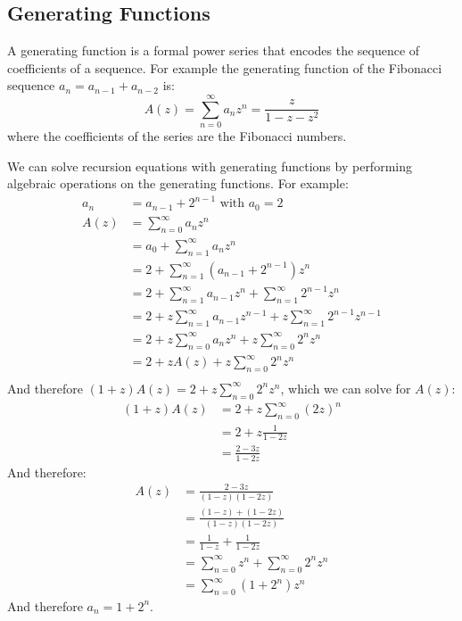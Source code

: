 \subsection{Generating Functions}
A generating function is a formal power series that encodes the sequence of coefficients of a sequence. For example the generating function of the Fibonacci sequence \( a_n = a_{n-1} + a_{n-2} \) is:
\begin{equation*}
    A(z) = \sum_{n=0}^{\infty} a_n z^n = \frac{z}{1 - z - z^2}
\end{equation*}
where the coefficients of the series are the Fibonacci numbers.

We can solve recursion equations with generating functions by performing algebraic operations on the generating functions. For example:
\begin{align*}
    a_n &= a_{n-1} + 2^{n-1} \text{ with } a_0 = 2 \\
    A(z) &= \sum_{n=0}^{\infty} a_n z^n \\
    &= a_0 + \sum_{n=1}^{\infty} a_n z^n \\
    &= 2 + \sum_{n=1}^{\infty} \left( a_{n-1} + 2^{n-1} \right) z^n \\
    &= 2 + \sum_{n=1}^{\infty} a_{n-1} z^n + \sum_{n=1}^{\infty} 2^{n-1} z^n \\
    &= 2 + z\sum_{n=1}^{\infty} a_{n-1} z^{n-1} + z\sum_{n=1}^{\infty} 2^{n-1} z^{n-1} \\
    &= 2 + z\sum_{n=0}^{\infty} a_n z^n + z\sum_{n=0}^{\infty} 2^n z^n \\
    &= 2 + zA(z) + z\sum_{n=0}^{\infty} 2^n z^n \\
\end{align*}
And therefore \( (1 + z) A(z) = 2 + z \sum_{n=0}^{\infty} 2^n z^n \), which we can solve for \( A(z) \):
\begin{align*}
    (1 + z) A(z) &= 2 + z \sum_{n=0}^{\infty} \left( 2z \right)^n \\
    &= 2 + z \frac{1}{1 - 2z} \\
    &= \frac{2 - 3z}{1 - 2z} 
\end{align*}
And therefore:
\begin{align*}
    A(z) &= \frac{2 - 3z}{(1 - z)(1 - 2z)} \\
    &= \frac{(1 - z) + (1 - 2z)}{(1 - z)(1 - 2z)} \\
    &= \frac{1}{1 - z} + \frac{1}{1 - 2z} \\
    &= \sum_{n=0}^{\infty} z^n + \sum_{n=0}^{\infty} 2^n z^n \\
    &= \sum_{n=0}^{\infty} \left( 1 + 2^n \right) z^n
\end{align*}
And therefore \( a_n = 1 + 2^n \).

